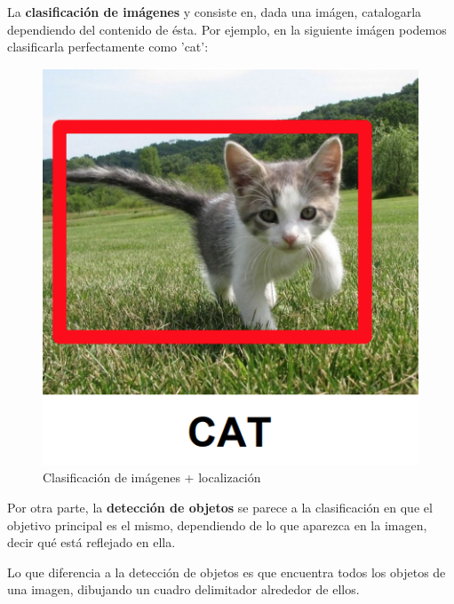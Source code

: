 \documentclass[11pt,a4paper]{article}
\begin{document}
La \textbf{clasificación de imágenes} y consiste en, dada una imágen, catalogarla dependiendo del contenido de ésta. Por ejemplo, en la siguiente
imágen podemos clasificarla perfectamente como 'cat':
\begin{figure}[H]
\centering
\includegraphics[scale=0.5]{img/classifier.png}
\caption{Clasificación de imágenes + localización}
\end{figure}

Por otra parte, la \textbf{detección de objetos} se parece a la clasificación en que el objetivo principal es el mismo, dependiendo de lo que aparezca en la
imagen, decir qué está reflejado en ella.

Lo que diferencia a la detección de objetos es que encuentra todos los objetos de una imagen, dibujando un cuadro delimitador alrededor de ellos.
\end{document}
